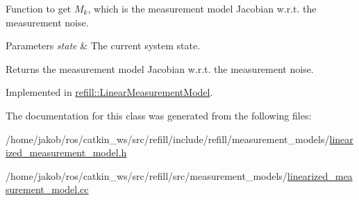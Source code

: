 Function to get $ M_k $, which is the measurement model Jacobian w.\+r.\+t. the measurement noise. 


\begin{DoxyParams}{Parameters}
{\em state} & The current system state. \\
\hline
\end{DoxyParams}
\begin{DoxyReturn}{Returns}
the measurement model Jacobian w.\+r.\+t. the measurement noise. 
\end{DoxyReturn}


Implemented in \hyperlink{classrefill_1_1LinearMeasurementModel_ab31ce79fd4d2c62717443a052249f8f6}{refill\+::\+Linear\+Measurement\+Model}.



The documentation for this class was generated from the following files\+:\begin{DoxyCompactItemize}
\item 
/home/jakob/ros/catkin\+\_\+ws/src/refill/include/refill/measurement\+\_\+models/\hyperlink{linearized__measurement__model_8h}{linearized\+\_\+measurement\+\_\+model.\+h}\item 
/home/jakob/ros/catkin\+\_\+ws/src/refill/src/measurement\+\_\+models/\hyperlink{linearized__measurement__model_8cc}{linearized\+\_\+measurement\+\_\+model.\+cc}\end{DoxyCompactItemize}
